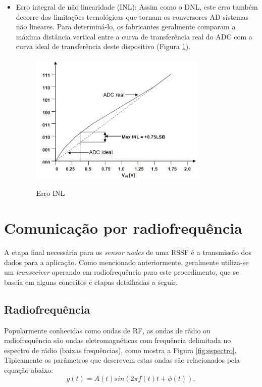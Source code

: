 \documentclass[oneside,openright,12pt]{ufsm_2015} %
\begin{document}
\begin{itemize}
    \item Erro integral de não linearidade (INL):
    Assim como o DNL, este erro também decorre das limitações tecnológicas que tornam os conversores AD sistemas não lineares. Para determiná-lo, os fabricantes geralmente comparam a máxima distância vertical entre a curva de transferência real do ADC com a curva ideal de transferência deste dispositivo (Figura \ref{fig:inl-adc}).
    
    \begin{figure}[ht]
    \caption{\label{exepretex} Erro INL}
    \centering
    \includegraphics[width=0.8\textwidth]{figuras/adc-inl.png}
    \vspace{\baselineskip} %
        \label{fig:inl-adc}
    \end{figure}
\end{itemize}


\section{Comunicação por radiofrequência}
A etapa final necessária para os \textit{sensor nodes} de uma RSSF é a transmissão dos dados para a aplicação. Como mencionado anteriormente, geralmente utiliza-se um \textit{transceiver} operando em radiofrequência para este procedimento, que se baseia em alguns conceitos e etapas detalhadas a seguir.

\subsection{Radiofrequência}
Popularmente conhecidas como ondas de RF, as ondas de rádio ou radiofrequência são ondas eletromagnéticas com frequência delimitada no espectro de rádio (baixas frequências), como mostra a Figura \ref{fig:espectro}. Tipicamente os parâmetros que descrevem estas ondas são relacionados pela equação abaixo:
\begin{equation}
    y(t) = A(t)sin(2\pi f(t)t + \phi (t)),
\end{equation}
\end{document}
